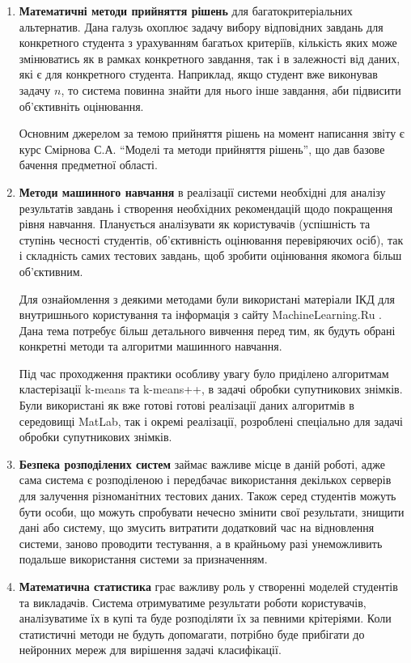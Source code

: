 \begin{enumerate}
    \item
        \textbf{Математичні методи прийняття рішень} для багатокритеріальних
        альтернатив.
        Дана галузь охоплює задачу вибору відповідних завдань для
        конкретного студента з урахуванням багатьох критеріїв, кількість яких
        може змінюватись як в рамках конкретного завдання, так і в залежності
        від даних, які є для конкретного студента.
        Наприклад, якщо студент вже виконував задачу $n$, то система повинна
        знайти для нього інше завдання, аби підвисити об’єктивніть оцінювання.

        Основним джерелом за темою прийняття рішень на момент написання звіту
        є курс Смірнова С.А. ``Моделі та методи прийняття рішень'', що дав
        базове бачення предметної області.
    \item
        \textbf{Методи машинного навчання} в реалізації системи необхідні для
        аналізу результатів завдань і створення необхідних рекомендацій щодо
        покращення рівня навчання. Планується аналізувати як користувачів
        (успішність та ступінь чесності студентів, об’єктивність оцінювання
        перевіряючих осіб), так і складність самих тестових завдань,
        щоб зробити оцінювання якомога більш об’єктивним.

        Для ознайомлення з деякими методами були використані матеріали ІКД
        для внутришнього користування та інформація з сайту MachineLearning.Ru
        \cite{Machinelearning}.
        Дана тема потребує більш детального вивчення перед тим, як будуть
        обрані конкретні методи та алгоритми машинного навчання.

        Під час проходження практики особливу увагу було приділено алгоритмам
        кластерізації k-means та k-means++, в задачі обробки супутникових
        знімків. Були використані як вже готові готові реалізації даних
        алгоритмів в середовищі MatLab, так і окремі реалізації, розроблені
        спеціально для задачі обробки супутникових знімків.
    \item
        \textbf{Безпека розподілених систем} займає важливе місце в даній
        роботі, адже сама система є розподіленою і передбачає використання
        декількох серверів для залучення різноманітних тестових даних.
        Також серед студентів можуть бути особи, що можуть спробувати нечесно
        змінити свої результати, знищити дані або систему, що змусить
        витратити додатковий час на відновлення системи, заново проводити
        тестування, а в крайньому разі унеможливить подальше використання
        системи за призначенням.
    \item
        \textbf{Математична статистика} грає важливу роль у створенні моделей
        студентів та викладачів.
        Система отримуватиме результати роботи користувачів, аналізуватиме їх в
        купі та буде розподіляти їх за певними крітеріями.
        Коли статистичні методи не будуть допомагати, потрібно буде прибігати
        до нейронних мереж для вирішення задачі класифікації.
\end{enumerate}
